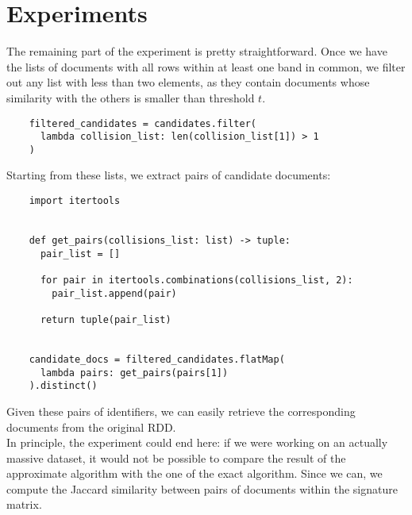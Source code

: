\documentclass{article}
\begin{document}
  \section{Experiments}
  The remaining part of the experiment is pretty straightforward. Once we have
  the lists of documents with all rows within at least one band in common, we
  filter out any list with less than two elements, as they contain documents
  whose similarity with the others is smaller than threshold \( t \).
  \begin{verbatim}
    filtered_candidates = candidates.filter(
      lambda collision_list: len(collision_list[1]) > 1
    )
  \end{verbatim}
  Starting from these lists, we extract pairs of candidate documents:
  \begin{verbatim}
    import itertools


    def get_pairs(collisions_list: list) -> tuple:
      pair_list = []

      for pair in itertools.combinations(collisions_list, 2):
        pair_list.append(pair)

      return tuple(pair_list)


    candidate_docs = filtered_candidates.flatMap(
      lambda pairs: get_pairs(pairs[1])
    ).distinct()
  \end{verbatim}
  Given these pairs of identifiers, we can easily retrieve the corresponding
  documents from the original RDD. \\
  In principle, the experiment could end here: if we were working on an
  actually massive dataset, it would not be possible to compare the result of
  the approximate algorithm with the one of the exact algorithm. Since we can,
  we compute the Jaccard similarity between pairs of documents within the
  signature matrix.
\end{document}
